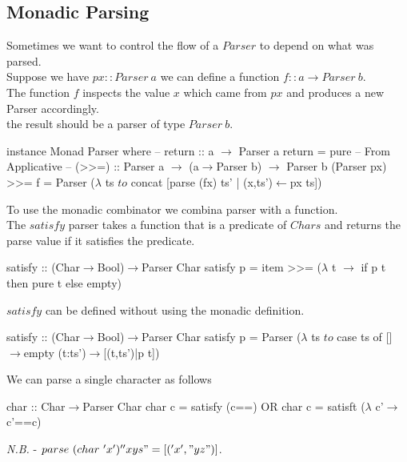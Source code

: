 \documentclass[11pt,a4paper]{article}
\begin{document}
\subsection{Monadic Parsing}

Sometimes we want to control the flow of a $Parser$ to depend on what was parsed.\\
Suppose we have $px::Parser\ a$ we can define a function $f::a\to Parser\ b$.\\
The function $f$ inspects the value $x$ which came from $px$ and produces a new Parser accordingly.\\
the result should be a parser of type $Parser\ b$.\\

\begin{code}
instance Monad Parser where
-- return :: a $\to$ Parser a
   return = pure        -- From Applicative
-- (>>=) :: Parser a $\to$ (a$\to$Parser b) $\to$ Parser b
   (Parser px) >>= f = Parser ($\lambda$ ts $to$
                              concat [parse (fx) ts'
                                     | (x,ts')$\leftarrow$px ts])
\end{code}

To use the monadic combinator we combina  parser with a function.\\
The $satisfy$ parser takes a function that is a predicate of $Chars$ and returns the parse value if it satisfies the predicate.
\begin{code}
satisfy :: (Char$\to$Bool)$\to$Parser Char
satisfy p = item >>= ($\lambda$ t $\to$ if p t
                             then pure t
                             else empty)
\end{code}

$satisfy$ can be defined without using the monadic definition.
\begin{code}
satisfy :: (Char$\to$Bool)$\to$Parser Char
satisfy p = Parser ($\lambda$ ts $to$ case ts of
                    []$\to$empty
                    (t:ts')$\to$[(t,ts')|p t])
\end{code}

We can parse a single character as follows
\begin{code}
char :: Char$\to$Parser Char
char c = satisfy (c==)
OR
char c = satisft ($\lambda$ c'$\to$c'==c)
\end{code}
\textit{N.B.} - $parse\ (char\ 'x') ''xys" = [('x',"yz")]$.\\
\end{document}
